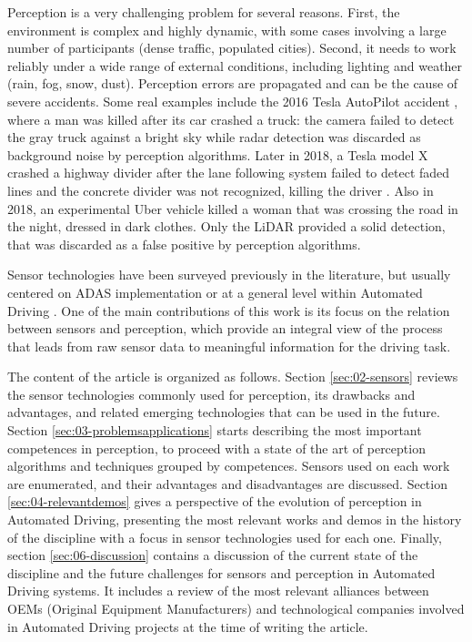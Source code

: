 \documentclass[journal]{IEEEtran}
\begin{document}
Perception is a very challenging problem for several
reasons. First, the environment is complex and highly dynamic, with some cases
involving a large number of participants (dense traffic, populated cities). 
Second, it needs to work reliably under a wide range of external conditions, 
including lighting and weather (rain, fog, snow, dust). 
Perception errors are propagated and can be the cause of severe accidents. 
Some real examples include the 2016 Tesla AutoPilot accident \cite{NTSB2017},
where a man was killed after its car crashed a truck: 
the camera failed to detect the gray truck against a bright sky while radar
detection was discarded as background noise by perception algorithms.
Later in 2018, a Tesla model X crashed a highway divider after the lane
following system failed to detect faded lines and the concrete divider was not
recognized, killing the driver \cite{NTSB2018a}.
Also in 2018, an experimental Uber vehicle killed a woman that was
crossing the road \cite{NTSB2018} in the night, dressed in dark clothes. 
Only the LiDAR provided a solid detection, that was discarded as a false
positive by perception algorithms.

Sensor technologies have been surveyed previously in the literature, 
but usually centered on ADAS implementation \cite{Yenkanchi2016,Ziebinski2016a} 
or at a general level within Automated Driving \cite{Pendleton2017}. 
One of the main contributions of this work is its focus on the relation between 
sensors and perception, which provide an integral view of the process that 
leads from raw sensor data to meaningful information for the driving task.

The content of the article is organized as follows. Section 
\ref{sec:02-sensors} reviews the sensor technologies commonly used for 
perception, its drawbacks and advantages, and related emerging 
technologies that can be used in the future. 
Section \ref{sec:03-problemsapplications} starts describing the most important 
competences in perception, to proceed with a state of the art of perception 
algorithms and techniques grouped by competences. Sensors used on each work
are enumerated, and their advantages and disadvantages are discussed. 
Section \ref{sec:04-relevantdemos} gives a perspective of the evolution of
perception in Automated Driving, presenting the most relevant works and demos
in the history of the discipline with a focus in sensor technologies used for
each one. 
Finally, section \ref{sec:06-discussion} contains a discussion of the current
state of the discipline and the future challenges for sensors and perception in
Automated Driving systems. It includes a review of the most relevant alliances 
between OEMs (Original Equipment Manufacturers) and technological companies
involved in Automated Driving projects at the time of writing the article.
\end{document}
